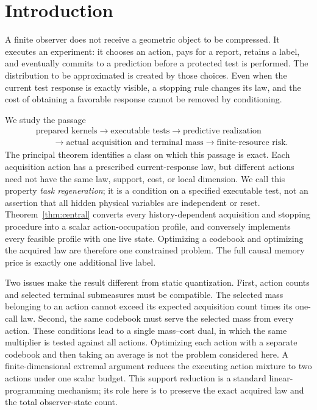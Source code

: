 \section{Introduction}
A finite observer does not receive a geometric object to be compressed. It executes an experiment: it chooses an action, pays for a report, retains a label, and eventually commits to a prediction before a protected test is performed. The distribution to be approximated is created by those choices. Even when the current test response is exactly visible, a stopping rule changes its law, and the cost of obtaining a favorable response cannot be removed by conditioning.

We study the passage
\[
\begin{aligned}
&\text{prepared kernels}\longrightarrow\text{executable tests}
 \longrightarrow\text{predictive realization}\\
&\hspace{2em}\longrightarrow\text{actual acquisition and terminal mass}
 \longrightarrow\text{finite-resource risk}.
\end{aligned}
\]
The principal theorem identifies a class on which this passage is exact. Each acquisition action has a prescribed current-response law, but different actions need not have the same law, support, cost, or local dimension. We call this property \emph{task regeneration}; it is a condition on a specified executable test, not an assertion that all hidden physical variables are independent or reset. Theorem~\ref{thm:central} converts every history-dependent acquisition and stopping procedure into a scalar action-occupation profile, and conversely implements every feasible profile with one live state. Optimizing a codebook and optimizing the acquired law are therefore one constrained problem. The full causal memory price is exactly one additional live label.

Two issues make the result different from static quantization. First, action counts and selected terminal submeasures must be compatible. The selected mass belonging to an action cannot exceed its expected acquisition count times its one-call law. Second, the same codebook must serve the selected mass from every action. These conditions lead to a single mass--cost dual, in which the same multiplier is tested against all actions. Optimizing each action with a separate codebook and then taking an average is not the problem considered here. A finite-dimensional extremal argument reduces the executing action mixture to two actions under one scalar budget. This support reduction is a standard linear-programming mechanism; its role here is to preserve the exact acquired law and the total observer-state count.

